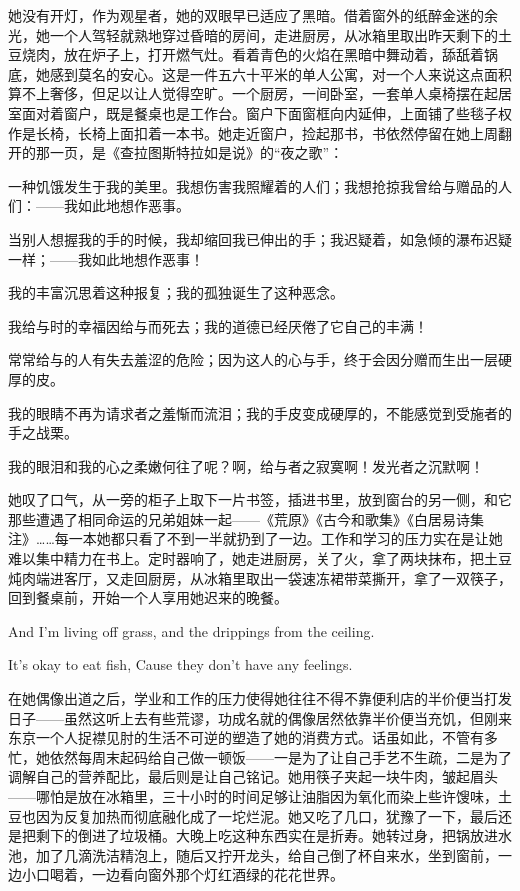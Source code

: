 \documentclass{article}
\begin{document}
她没有开灯，作为观星者，她的双眼早已适应了黑暗。借着窗外的纸醉金迷的余光，她一个人驾轻就熟地穿过昏暗的房间，走进厨房，从冰箱里取出昨天剩下的土豆烧肉，放在炉子上，打开燃气灶。看着青色的火焰在黑暗中舞动着，舔舐着锅底，她感到莫名的安心。这是一件五六十平米的单人公寓，对一个人来说这点面积算不上奢侈，但足以让人觉得空旷。一个厨房，一间卧室，一套单人桌椅摆在起居室面对着窗户，既是餐桌也是工作台。窗户下面窗框向内延伸，上面铺了些毯子权作是长椅，长椅上面扣着一本书。她走近窗户，捡起那书，书依然停留在她上周翻开的那一页，是《查拉图斯特拉如是说》的“夜之歌”：



一种饥饿发生于我的美里。我想伤害我照耀着的人们；我想抢掠我曾给与赠品的人们：——我如此地想作恶事。



当别人想握我的手的时候，我却缩回我已伸出的手；我迟疑着，如急倾的瀑布迟疑一样；——我如此地想作恶事！



我的丰富沉思着这种报复；我的孤独诞生了这种恶念。



我给与时的幸福因给与而死去；我的道德已经厌倦了它自己的丰满！



常常给与的人有失去羞涩的危险；因为这人的心与手，终于会因分赠而生出一层硬厚的皮。



我的眼睛不再为请求者之羞惭而流泪；我的手皮变成硬厚的，不能感觉到受施者的手之战栗。



我的眼泪和我的心之柔嫩何往了呢？啊，给与者之寂寞啊！发光者之沉默啊！



她叹了口气，从一旁的柜子上取下一片书签，插进书里，放到窗台的另一侧，和它那些遭遇了相同命运的兄弟姐妹一起——《荒原》《古今和歌集》《白居易诗集注》……每一本她都只看了不到一半就扔到了一边。工作和学习的压力实在是让她难以集中精力在书上。定时器响了，她走进厨房，关了火，拿了两块抹布，把土豆炖肉端进客厅，又走回厨房，从冰箱里取出一袋速冻裙带菜撕开，拿了一双筷子，回到餐桌前，开始一个人享用她迟来的晚餐。



And I'm living off grass, and the drippings from the ceiling.



It's okay to eat fish, Cause they don't have any feelings.



在她偶像出道之后，学业和工作的压力使得她往往不得不靠便利店的半价便当打发日子——虽然这听上去有些荒谬，功成名就的偶像居然依靠半价便当充饥，但刚来东京一个人捉襟见肘的生活不可逆的塑造了她的消费方式。话虽如此，不管有多忙，她依然每周末起码给自己做一顿饭——一是为了让自己手艺不生疏，二是为了调解自己的营养配比，最后则是让自己铭记。她用筷子夹起一块牛肉，皱起眉头——哪怕是放在冰箱里，三十小时的时间足够让油脂因为氧化而染上些许馊味，土豆也因为反复加热而彻底融化成了一坨烂泥。她又吃了几口，犹豫了一下，最后还是把剩下的倒进了垃圾桶。大晚上吃这种东西实在是折寿。她转过身，把锅放进水池，加了几滴洗洁精泡上，随后又拧开龙头，给自己倒了杯自来水，坐到窗前，一边小口喝着，一边看向窗外那个灯红酒绿的花花世界。
\end{document}
